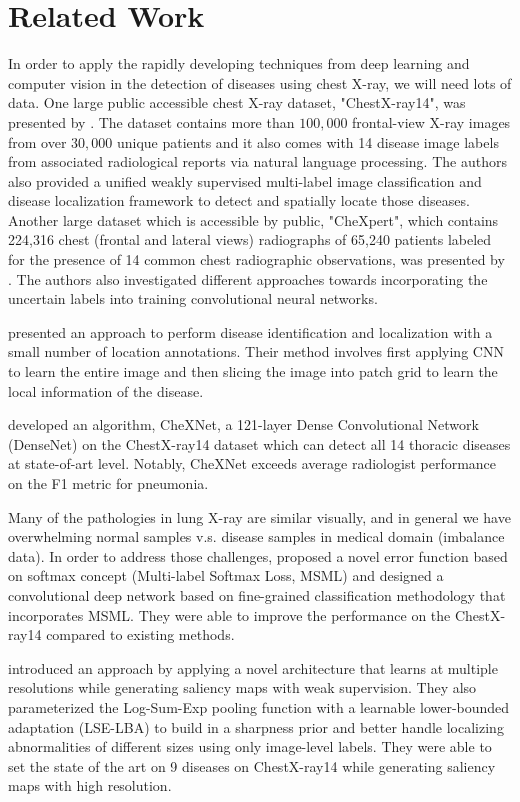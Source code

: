 \documentclass{amia}
\begin{document}
\section{Related Work}


In order to apply the rapidly developing techniques from deep learning and computer vision in the detection of diseases using chest X-ray, we will need lots of data.  One large public accessible chest X-ray dataset, "ChestX-ray14", was presented by {\color{cyan}\cite{wang}}. The dataset contains more than $100,000$ frontal-view X-ray images from over $30,000$ unique patients and it also comes with 14 disease image labels from associated radiological reports via natural language processing. The authors also  provided a unified weakly supervised multi-label image classification and disease localization framework to detect and spatially locate those diseases.  Another large dataset which is accessible by public, "CheXpert", which contains 224,316 chest (frontal and lateral views) radiographs of 65,240 patients labeled for the presence of 14 common chest radiographic observations, was presented by {\color{cyan}\cite{irvin}}.  The authors also investigated different approaches towards incorporating the uncertain labels into training convolutional neural networks.

{\color{cyan}\cite{Li2019}} presented an approach to perform disease identification and localization with a small number of location annotations. Their method involves first applying CNN to learn the entire image and then slicing the image into patch grid to learn the local information of the disease. 


{\color{cyan}\cite{rajpurkar}} developed an algorithm, CheXNet, a 121-layer Dense Convolutional Network (DenseNet) on the ChestX-ray14 dataset which can detect all 14 thoracic diseases at state-of-art level. Notably, CheXNet exceeds average radiologist performance on the F1 metric for pneumonia.

Many of the pathologies in lung X-ray are similar visually, and in general we have overwhelming normal samples v.s. disease samples in medical domain (imbalance data). In order to address those challenges, {\color{cyan}\cite{ge}} proposed a novel error function based on softmax concept (Multi-label Softmax Loss, MSML) and designed a convolutional deep network based on fine-grained classification methodology that incorporates MSML. They were able to improve the performance on the ChestX-ray14 compared to existing methods.


{\color{cyan}\cite{yao}} introduced an approach by applying a novel architecture that learns at multiple resolutions while generating saliency maps with weak supervision. They also parameterized the Log-Sum-Exp pooling function with a learnable lower-bounded adaptation (LSE-LBA) to build in a sharpness prior and better handle localizing abnormalities of different sizes using only image-level labels. They were able to set the state of the art on 9 diseases on ChestX-ray14 while generating saliency maps with high resolution.
\end{document}

